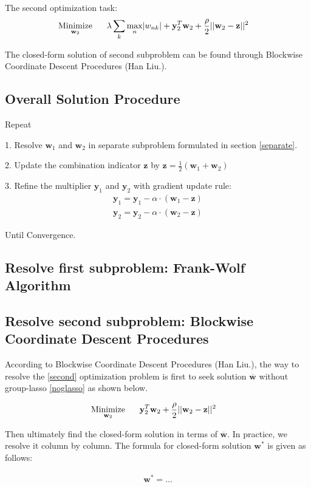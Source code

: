 \documentclass{article} %
\newcommand{\LTwoNorm}[1]{||#1||^{2}}
\newcommand{\sumk}{\sum_{k}}
\newcommand{\wnk}{w_{nk}}
\newcommand{\wone}{\mathbf{w}_1}
\newcommand{\wtwo}{\mathbf{w}_2}
\newcommand{\w}{\mathbf{w}}
\newcommand{\wbar}{\overline{\w}}
\newcommand{\wopt}{\mathbf{w^{*}}}
\newcommand{\maxn}{ \underset{n}{\text{max}} }
\newcommand{\yone}{\mathbf{y}_1}
\newcommand{\ytwo}{\mathbf{y}_2}
\newcommand{\z}{\mathbf{z}}
\newcommand{\quadraterm}[1]{\frac{\rho}{2}\LTwoNorm{\w_{#1}-\z}}
\newcommand{\minimize}[1]{ \underset{#1}{\text{Minimize}} }
\newcommand{\hs}{\hspace*{0.6cm}}
\begin{document}
 The second optimization task:
 \begin{align} \label{second}
   \minimize{\wtwo}
   \hs & \lambda \sumk \maxn | \wnk |  %
   + \mutw{2} + \quadraterm{2} 
 \end{align}

 The closed-form solution of second subproblem can be found through Blockwise
 Coordinate Descent Procedures (Han Liu.). 

\subsection{Overall Solution Procedure}
Repeat

1. Resolve $\wone$ and $\wtwo$ in separate subproblem formulated in section
\ref{separate}.

2. Update the combination indicator $\z$ by $\z = \frac{1}{2} (\wone + \wtwo)$

3. Refine the multiplier $\yone$ and $\ytwo$ with gradient update rule: 
\begin{align}
\yone = \yone - \alpha \cdot (\wone - \z) \\
\ytwo = \ytwo - \alpha \cdot (\wtwo - \z)
\end{align}

Until Convergence.

\subsection{Resolve first subproblem: Frank-Wolf Algorithm} 

\subsection{Resolve second subproblem: Blockwise Coordinate Descent Procedures} 
According to Blockwise Coordinate Descent Procedures (Han Liu.), the way to
resolve the \eqref{second} optimization problem is first to seek solution $\wbar$ without
group-lasso \eqref{noglasso} as shown below. 

\begin{align} \label{noglasso}
   \minimize{\wtwo}
   \hs & \mutw{2} + \quadraterm{2} 
 \end{align}

\newcommand{\ms}{m^{*}}
Then ultimately find the closed-form solution in terms of $\wbar$. In
practice, we resolve it column by column. The formula for closed-form
solution $\wopt$ is given as follows:

\begin{align}
    \wopt = ...
\end{align}
\end{document}
